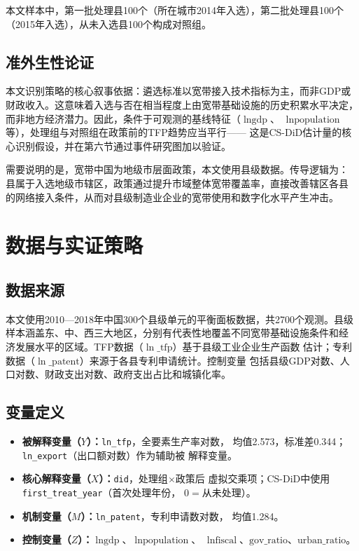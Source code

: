 \documentclass[12pt, a4paper]{article}
\begin{document}
本文样本中，第一批处理县100个（所在城市2014年入选），第二批处理县100个
（2015年入选），从未入选县100个构成对照组。

\subsection{准外生性论证}

本文识别策略的核心叙事依据：遴选标准以宽带接入技术指标为主，而非GDP或
财政收入。这意味着入选与否在相当程度上由宽带基础设施的历史积累水平决定，
而非地方经济潜力。因此，条件于可观测的基线特征（$\ln\text{gdp}$、
$\ln\text{population}$等），处理组与对照组在政策前的TFP趋势应当平行——
这是CS-DiD估计量的核心识别假设，并在第六节通过事件研究图加以验证。

需要说明的是，宽带中国为地级市层面政策，本文使用县级数据。传导逻辑为：
县属于入选地级市辖区，政策通过提升市域整体宽带覆盖率，直接改善辖区各县
的网络接入条件，从而对县级制造业企业的宽带使用和数字化水平产生冲击。

\section{数据与实证策略}

\subsection{数据来源}

本文使用2010—2018年中国300个县级单元的平衡面板数据，共2700个观测。县级
样本涵盖东、中、西三大地区，分别有代表性地覆盖不同宽带基础设施条件和经
济发展水平的区域。TFP数据（$\ln\_\text{tfp}$）基于县级工业企业生产函数
估计；专利数据（$\ln\_\text{patent}$）来源于各县专利申请统计。控制变量
包括县级GDP对数、人口对数、财政支出对数、政府支出占比和城镇化率。

\subsection{变量定义}

\begin{itemize}[leftmargin=2em]
  \item \textbf{被解释变量（$Y$）：}\texttt{ln\_tfp}，全要素生产率对数，
    均值2.573，标准差0.344；\texttt{ln\_export}（出口额对数）作为辅助被
    解释变量。
  \item \textbf{核心解释变量（$X$）：}\texttt{did}，处理组$\times$政策后
    虚拟交乘项；CS-DiD中使用\texttt{first\_treat\_year}（首次处理年份，
    0$=$从未处理）。
  \item \textbf{机制变量（$M$）：}\texttt{ln\_patent}，专利申请数对数，
    均值1.284。
  \item \textbf{控制变量（$Z$）：}$\ln\text{gdp}$、$\ln\text{population}$、
    $\ln\text{fiscal}$、$\text{gov\_ratio}$、$\text{urban\_ratio}$。
\end{itemize}
\end{document}
